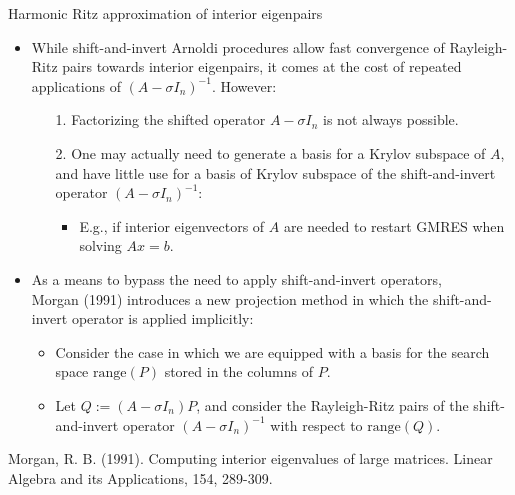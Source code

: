\documentclass[t,usepdftitle=false]{beamer}
\begin{document}
\begin{frame}{Harmonic Ritz approximation of interior eigenpairs}
	\begin{itemize}
	\item While shift-and-invert Arnoldi procedures allow fast convergence of Rayleigh-Ritz pairs towards interior eigenpairs, it comes at the cost of repeated applications of $(A-\sigma I_n)^{-1}$. However:
	\begin{enumerate}\normalsize
	\item[1.] Factorizing the shifted operator $A-\sigma I_n$ is not always possible.\vspace{.1cm}
	\item[2.] One may actually need to generate a basis for a Krylov subspace of $A$, and have little use for a basis of Krylov subspace of the shift-and-invert operator $(A-\sigma I_n)^{-1}$:
	\begin{itemize}\normalsize
	\item E.g., if interior eigenvectors of $A$ are needed to restart GMRES when solving $Ax=b$. 
	\end{itemize}
	\end{enumerate}
	\item As a means to bypass the need to apply shift-and-invert operators,\\ Morgan (1991) introduces a new projection method in which the shift-and-invert operator is applied implicitly:
	\begin{itemize}\normalsize
	\item Consider the case in which we are equipped with a basis for the search space $\text{range}(P)$ stored in the columns of $P$.\vspace{.025cm}
	\item Let $Q:=(A-\sigma I_n)P$, and consider the Rayleigh-Ritz pairs of the shift-and-invert operator $(A-\sigma I_n)^{-1}$ with respect to $\text{range}(Q)$.
	\end{itemize}
	\end{itemize}
	\smallskip
	\tiny{Morgan, R. B. (1991). Computing interior eigenvalues of large matrices. Linear Algebra and its Applications, 154, 289-309.}
\end{frame}
\end{document}
